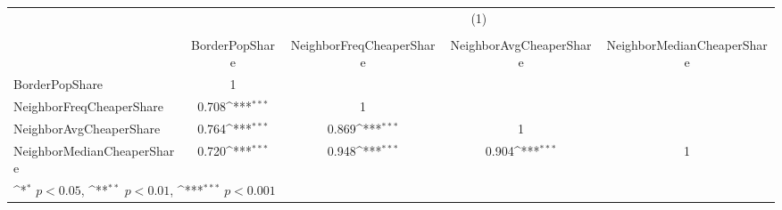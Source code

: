 {
\def\sym#1{\ifmmode^{#1}\else\(^{#1}\)\fi}
\begin{tabular}{l*{4}{c}}
\hline\hline
          &\multicolumn{4}{c}{(1)}                                                    \\
          &\multicolumn{4}{c}{}                                                       \\
          &BorderPopShare         &NeighborFreqCheaperShare         &NeighborAvgCheaperShare         &NeighborMedianCheaperShare         \\
\hline
BorderPopShare&        1         &                  &                  &                  \\
NeighborFreqCheaperShare&    0.708\sym{***}&        1         &                  &                  \\
NeighborAvgCheaperShare&    0.764\sym{***}&    0.869\sym{***}&        1         &                  \\
NeighborMedianCheaperShare&    0.720\sym{***}&    0.948\sym{***}&    0.904\sym{***}&        1         \\
\hline\hline
\multicolumn{5}{l}{\footnotesize \sym{*} \(p<0.05\), \sym{**} \(p<0.01\), \sym{***} \(p<0.001\)}\\
\end{tabular}
}

